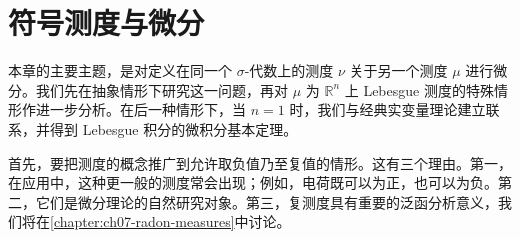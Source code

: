 \documentclass[../main.tex]{subfiles} %
\begin{document}
\chapter{符号测度与微分}\label{chapter:ch03-signed-measures-differentiation}
本章的主要主题，是对定义在同一个 $\sigma$-代数上的测度 $\nu$ 关于另一个测度 $\mu$ 进行微分。我们先在抽象情形下研究这一问题，再对 $\mu$ 为 $\mathbb{R}^n$ 上 Lebesgue 测度的特殊情形作进一步分析。在后一种情形下，当 $n=1$ 时，我们与经典实变量理论建立联系，并得到 Lebesgue 积分的微积分基本定理。

首先，要把测度的概念推广到允许取负值乃至复值的情形。这有三个理由。第一，在应用中，这种更一般的测度常会出现；例如，电荷既可以为正，也可以为负。第二，它们是微分理论的自然研究对象。第三，复测度具有重要的泛函分析意义，我们将在\cref{chapter:ch07-radon-measures}中讨论。






\end{document}

